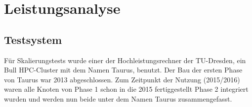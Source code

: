 \chapter{Leistungsanalyse}
\label{sct:benchmarks}

\section{Testsystem}
\label{sct:taurus}


Für Skalierungstests wurde einer der Hochleistungsrechner der TU-Dresden, ein Bull HPC-Cluster mit dem Namen Taurus, benutzt. Der Bau der ersten Phase von Taurus war 2013 abgeschlossen\cite{taurusnutzerschulung}.
Zum Zeitpunkt der Nutzung (2015/2016) waren alle Knoten von Phase 1 schon in die 2015 fertiggestellt\cite{heisehrsk2} Phase 2 integriert wurden\cite{doctudtaurushardware} und werden nun beide unter dem Namen Taurus zusammengefasst.


